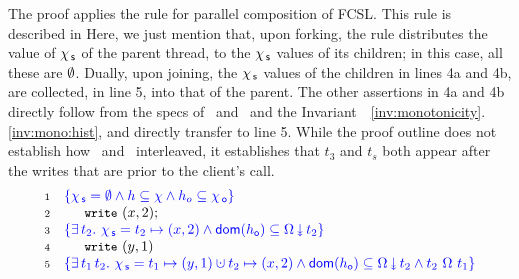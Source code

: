 The proof applies the rule for parallel composition of FCSL. This rule
is described in
%
\ifdefined{}
\fi
%
Here, we just mention that, upon forking, the rule distributes the
value of $\chi_{\, \mathsf{s}}$ of the parent thread, to the $\chi_{\, \mathsf{s}}$ values of its
children; in this case, all these are $\emptyset$. Dually, upon joining,
the $\chi_{\, \mathsf{s}}$ values of the children in lines 4a and 4b, are collected,
in line 5, into that of the parent. The other assertions in 4a and 4b
directly follow from the specs of \jyscan\ and \jywrite\ and the
Invariant~~\ref{inv:monotonicity}.\ref{inv:mono:hist}, and directly
transfer to line 5.
%
While the proof outline does not establish how
\jyscan\ and \jywrite\ interleaved, it establishes that $t_3$ and $t_s$
both appear after the writes that are prior to the client's call.
{\small
\[
\begin{array}{r l}
  \num{1} & \specK{\{ \histS = \hempty \wedge h \subseteq \hist \wedge
    h_o \subseteq \histO \}} \\ %
  \num{2} & \esc{write}~(x,2);\\
  \num{3} & \specK{\{ \exists\, t_2 \ldot\, \histS = t_2 \hpts (x,2) \wedge \dom{h_{\othersub}} \subseteq \sideal{\stableorder}{t_2} \}} \\
  \num{4} & \esc{write}~(y,1)\\
  \num{5} & \specK{\{ \exists\, t_1\, t_2\ldot\, 
    \histS = t_1 \hpts (y,1) \hunion t_2 \hpts (x,2) \wedge %
    \dom{h_{\othersub}} \subseteq \sideal{\stableorder}{t_2} \wedge 
    t_2\ {\stableorder}\ t_1\}}
\end{array}
\]}

